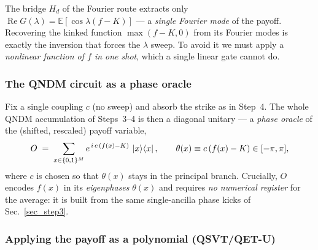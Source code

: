 \documentclass{article}
\begin{document}
The bridge $H_d$ of the Fourier route extracts only $\operatorname{Re}G(\lambda)=\mathbb{E}[\cos\lambda(f-K)]$ --- a \emph{single Fourier mode} of the payoff. Recovering the kinked function $\max(f-K,0)$ from its Fourier modes is exactly the inversion that forces the $\lambda$ sweep. To avoid it we must apply a \emph{nonlinear function of $f$ in one shot}, which a single linear gate cannot do.

\subsubsection{The QNDM circuit as a phase oracle}

Fix a single coupling $c$ (no sweep) and absorb the strike as in Step~4. The whole QNDM accumulation of Steps~3--4 is then a diagonal unitary --- a \emph{phase oracle} of the (shifted, rescaled) payoff variable,
\begin{equation}\label{eq_phase_oracle}
O \;=\; \sum_{x\in\{0,1\}^M} e^{\,i\,c\,(f(x)-K)}\,\ket{x}\!\bra{x},
\qquad
\theta(x) \equiv c\,(f(x)-K) \in [-\pi,\pi],
\end{equation}
where $c$ is chosen so that $\theta(x)$ stays in the principal branch. Crucially, $O$ encodes $f(x)$ in its \emph{eigenphases} $\theta(x)$ and requires \emph{no numerical register} for the average: it is built from the same single-ancilla phase kicks of Sec.~\ref{sec_step3}.

\subsubsection{Applying the payoff as a polynomial (QSVT/QET-U)}
\end{document}
